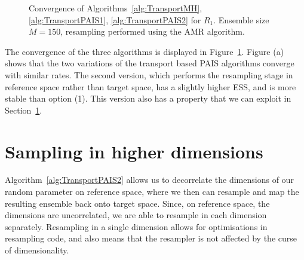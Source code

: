\documentclass[final]{siamltex}
\begin{document}
\begin{figure}[!h]
\centering
{}
\caption{Convergence of Algorithms~\ref{alg:TransportMH}, \ref{alg:TransportPAIS1}, \ref{alg:TransportPAIS2} for $R_1$. Ensemble size $M=150$, resampling performed using the AMR algorithm.}
\label{fig:R2_l2_convergence}
\end{figure}

The convergence of the three algorithms is displayed in Figure~\ref{fig:R2_l2_convergence}. Figure (a) shows that the two variations of the transport based PAIS algorithms converge with similar rates. The second version, which performs the resampling stage in reference space rather than target space, has a slightly higher ESS, and is more stable than option (1). This version also has a property that we can exploit in Section~\ref{sec:TPAIS_higher_dim}.

\section{Sampling in higher dimensions}\label{sec:TPAIS_higher_dim}

Algorithm~\ref{alg:TransportPAIS2} allows us to decorrelate the dimensions of our random parameter on reference space, where we then can resample and map the resulting ensemble back onto target space. Since, on reference space, the dimensions are uncorrelated, we are able to resample in each dimension separately. Resampling in a single dimension allows for optimisations in resampling code, and also means that the resampler is not affected by the curse of dimensionality.
\end{document}
